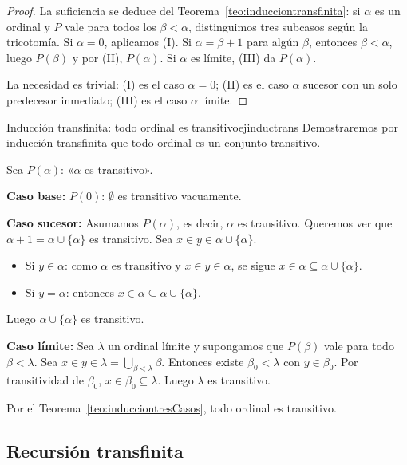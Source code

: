 \begin{proof}
La suficiencia se deduce del Teorema~\ref{teo:inducciontransfinita}: si $\alpha$ es un ordinal y $P$ vale para todos los $\beta < \alpha$, distinguimos tres subcasos según la tricotomía. Si $\alpha = 0$, aplicamos (I). Si $\alpha = \beta + 1$ para algún $\beta$, entonces $\beta < \alpha$, luego $P(\beta)$ y por (II), $P(\alpha)$. Si $\alpha$ es límite, (III) da $P(\alpha)$.

La necesidad es trivial: (I) es el caso $\alpha = 0$; (II) es el caso $\alpha$ sucesor con un solo predecesor inmediato; (III) es el caso $\alpha$ límite.
\end{proof}

\begin{ejemplo}{Inducción transfinita: todo ordinal es transitivo}{ejinductrans}
Demostraremos por inducción transfinita que todo ordinal es un conjunto transitivo.

Sea $P(\alpha)$: «$\alpha$ es transitivo».

\textbf{Caso base:} $P(0)$: $\emptyset$ es transitivo vacuamente. \checkmark

\textbf{Caso sucesor:} Asumamos $P(\alpha)$, es decir, $\alpha$ es transitivo. Queremos ver que $\alpha + 1 = \alpha \cup \{\alpha\}$ es transitivo. Sea $x \in y \in \alpha \cup \{\alpha\}$.
\begin{itemize}
  \item Si $y \in \alpha$: como $\alpha$ es transitivo y $x \in y \in \alpha$, se sigue $x \in \alpha \subseteq \alpha \cup \{\alpha\}$.
  \item Si $y = \alpha$: entonces $x \in \alpha \subseteq \alpha \cup \{\alpha\}$.
\end{itemize}
Luego $\alpha \cup \{\alpha\}$ es transitivo. \checkmark

\textbf{Caso límite:} Sea $\lambda$ un ordinal límite y supongamos que $P(\beta)$ vale para todo $\beta < \lambda$. Sea $x \in y \in \lambda = \bigcup_{\beta < \lambda} \beta$. Entonces existe $\beta_0 < \lambda$ con $y \in \beta_0$. Por transitividad de $\beta_0$, $x \in \beta_0 \subseteq \lambda$. Luego $\lambda$ es transitivo. \checkmark

Por el Teorema~\ref{teo:inducciontresCasos}, todo ordinal es transitivo.
\end{ejemplo}

\subsection{Recursión transfinita}

